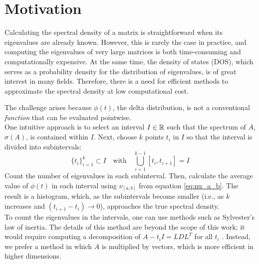 \section{Motivation}
Calculating the spectral density of a matrix is straightforward when its eigenvalues are already known.
However, this is rarely the case in practice, and computing the eigenvalues of very large matrices is both time-consuming and computationally expensive.
At the same time, the density of states (DOS), which serves as a probability density for the distribution of eigenvalues, is of great interest in many fields.
Therefore, there is a need for efficient methods to approximate the spectral density at low computational cost.

The challenge arises because $\phi(t)$, the delta distribution, is not a conventional \emph{function} that can be evaluated pointwise.\\
One intuitive approach is to select an interval $I \in \mathbb{R}$ such that the spectrum of $A$, $\sigma(A)$, is contained within $I$.
Next, choose $k$ points $t_i$ in $I$ so that the interval is divided into subintervals:
$$\{t_i\}_{i = 1}^k \subset I \quad \text{with} \quad \bigcup_{i = 1}^{k - 1} [t_i, t_{i+1}] = I$$
Count the number of eigenvalues in each subinterval.
Then, calculate the average value of $\phi(t)$ in each interval using $\nu_{[a, b]}$ from equation \ref{eq:nu_a_b}.
The result is a histogram, which, as the subintervals become smaller (i.e., as $k$ increases and $(t_{i+1} - t_i) \longrightarrow 0$), approaches the true spectral density.\\
To count the eigenvalues in the intervals, one can use methods such as Sylvester's law of inertia.
The details of this method are beyond the scope of this work;
it would require computing a decomposition of $A - t_i I = LDL^T$ for all $t_i$ \cite{golubvanloan}.
Instead, we prefer a method in which $A$ is multiplied by vectors, which is more efficient in higher dimensions.\\